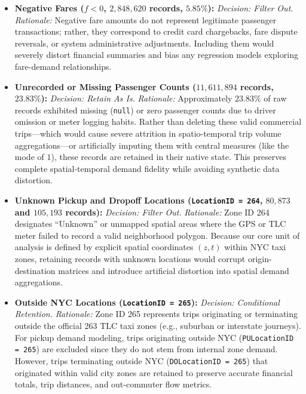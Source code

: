 \documentclass[11pt,a4paper]{article}
\begin{document}
\begin{itemize}
    \item \textbf{Negative Fares ($f < 0$, $2,848,620$ records, $5.85\%$):} 
    \textit{Decision: Filter Out.} 
    \textit{Rationale:} Negative fare amounts do not represent legitimate passenger transactions; rather, they correspond to credit card chargebacks, fare dispute reversals, or system administrative adjustments. Including them would severely distort financial summaries and bias any regression models exploring fare-demand relationships.

    \item \textbf{Unrecorded or Missing Passenger Counts ($11,611,894$ records, $23.83\%$):} 
    \textit{Decision: Retain As Is.} 
    \textit{Rationale:} Approximately $23.83\%$ of raw records exhibited missing (\texttt{null}) or zero passenger counts due to driver omission or meter logging habits. Rather than deleting these valid commercial trips—which would cause severe attrition in spatio-temporal trip volume aggregations—or artificially imputing them with central measures (like the mode of $1$), these records are retained in their native state. This preserves complete spatial-temporal demand fidelity while avoiding synthetic data distortion.
    
    \item \textbf{Unknown Pickup and Dropoff Locations (\texttt{LocationID = 264}, $80,873$ and $105,193$ records):} 
    \textit{Decision: Filter Out.} 
    \textit{Rationale:} Zone ID 264 designates ``Unknown'' or unmapped spatial areas where the GPS or TLC meter failed to record a valid neighborhood polygon. Because our core unit of analysis is defined by explicit spatial coordinates $(z, t)$ within NYC taxi zones, retaining records with unknown locations would corrupt origin-destination matrices and introduce artificial distortion into spatial demand aggregations.
    
    \item \textbf{Outside NYC Locations (\texttt{LocationID = 265}):} 
    \textit{Decision: Conditional Retention.} 
    \textit{Rationale:} Zone ID 265 represents trips originating or terminating outside the official 263 TLC taxi zones (e.g., suburban or interstate journeys). For pickup demand modeling, trips originating outside NYC (\texttt{PULocationID = 265}) are excluded since they do not stem from internal zone demand. However, trips terminating outside NYC (\texttt{DOLocationID = 265}) that originated within valid city zones are retained to preserve accurate financial totals, trip distances, and out-commuter flow metrics.
\end{itemize}
\end{document}
